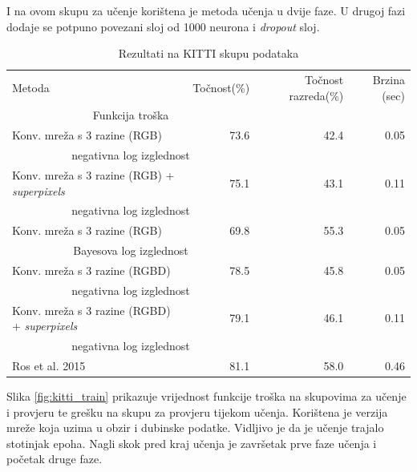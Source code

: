 \documentclass[times, utf8, diplomski, numeric]{fer}
\begin{document}
I na ovom skupu za učenje korištena je metoda učenja u dvije faze. U drugoj fazi dodaje se potpuno povezani sloj od 1000 neurona i \textit{dropout} sloj.

\begin{table}
\centering

\begin{adjustbox}{center}
\begin{tabular}{l r r r}
  Metoda & Točnost(\%) & Točnost razreda(\%) & Brzina (sec) \\
    \multicolumn{2}{c}{Funkcija troška} & & \\[0.6em] \hline

  Konv. mreža s 3 razine (RGB) & 73.6 & 42.4 & 0.05 \\
    \multicolumn{2}{c}{negativna log izglednost} & & \\ \hline
  Konv. mreža s 3 razine (RGB) + \textit{superpixels} & 75.1 & 43.1 & 0.11 \\
    \multicolumn{2}{c}{negativna log izglednost} & & \\ \hline
  Konv. mreža s 3 razine (RGB) & 69.8 & 55.3 & 0.05 \\
    \multicolumn{2}{c}{Bayesova log izglednost} & & \\ \hline
  Konv. mreža s 3 razine (RGBD) & 78.5 & 45.8 & 0.05 \\
    \multicolumn{2}{c}{negativna log izglednost} & & \\ \hline
  Konv. mreža s 3 razine (RGBD) + \textit{superpixels} & 79.1 & 46.1 & 0.11 \\
    \multicolumn{2}{c}{negativna log izglednost} & & \\ \hline \hline
    
  Ros et al.\cite{ros:2015} 2015 & 81.1 & 58.0 & 0.46
\end{tabular}
\end{adjustbox}

\caption{Rezultati na KITTI skupu podataka}
\end{table}

Slika \ref{fig:kitti_train} prikazuje vrijednost funkcije troška na skupovima za učenje i provjeru te grešku na skupu za provjeru tijekom učenja. Korištena je verzija mreže koja uzima u obzir i dubinske podatke. Vidljivo je da je učenje trajalo stotinjak epoha. Nagli skok pred kraj učenja je završetak prve faze učenja i početak druge faze.
\end{document}
